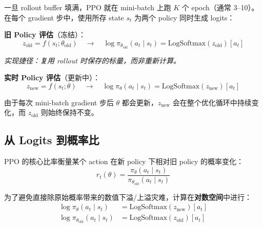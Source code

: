 一旦 rollout buffer 填满，PPO 就在 mini-batch 上跑 $K$ 个 epoch（通常 3--10）。在每个 gradient 步中，使用所存 state $s_t$ 为两个 policy 同时生成 logits：

\textbf{旧 Policy 评估}（冻结）：
\begin{equation}
z_{\text{old}} = f(s_t; \theta_{\text{old}}) \quad \longrightarrow \quad \log \pi_{\theta_{\text{old}}}(a_t \mid s_t) = \text{LogSoftmax}(z_{\text{old}})[a_t]
\end{equation}

\emph{实现捷径：复用 rollout 时保存的标量，而非重新计算。}

\textbf{实时 Policy 评估}（更新中）：
\begin{equation}
z_{\text{new}} = f(s_t; \theta) \quad \longrightarrow \quad \log \pi_\theta(a_t \mid s_t) = \text{LogSoftmax}(z_{\text{new}})[a_t]
\end{equation}

由于每次 mini-batch gradient 步后 $\theta$ 都会更新，$z_{\text{new}}$ 会在整个优化循环中持续变化，而 $z_{\text{old}}$ 则始终保持不变。

\subsection{从 Logits 到概率比}
\label{from-logits-to-probability-ratio}

PPO 的核心比率衡量某个 action 在新 policy 下相对旧 policy 的概率变化：
\begin{equation}
\boxed{r_t(\theta) = \frac{\pi_\theta(a_t \mid s_t)}{\pi_{\theta_{\text{old}}}(a_t \mid s_t)}}
\end{equation}

为了避免直接除原始概率带来的数值下溢/上溢灾难，计算在\textbf{对数空间}中进行：
\begin{align}
\log \pi_\theta(a_t \mid s_t) &= \text{LogSoftmax}(z_{\text{new}})[a_t] \\
\log \pi_{\theta_{\text{old}}}(a_t \mid s_t) &= \text{LogSoftmax}(z_{\text{old}})[a_t]
\end{align}


